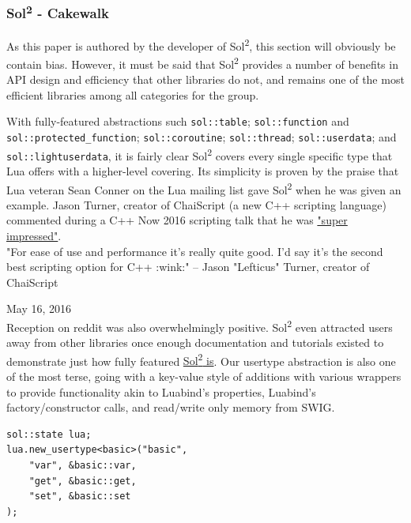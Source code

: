 \documentclass[conference,compsoc]{IEEEtran}
\newcommand{\soltwo}{Sol\textsuperscript{2}}
\begin{document}
\subsubsection{\soltwo{} - Cakewalk}

As this paper is authored by the developer of \soltwo{}, this section will obviously be contain bias. However, it must be said that \soltwo{} provides a number of benefits in API design and efficiency that other libraries do not, and remains one of the most efficient libraries among all categories for the group. 

With fully-featured abstractions such \lstinline|sol::table|; \lstinline|sol::function| and \lstinline|sol::protected_function|; \lstinline|sol::coroutine|; \lstinline|sol::thread|; \lstinline|sol::userdata|; and \lstinline|sol::lightuserdata|, it is fairly clear \soltwo{} covers every single specific type that Lua offers with a higher-level covering. Its simplicity is proven by the praise that Lua veteran Sean Conner on the Lua mailing list gave \soltwo{} when he was given an example\cite{conman-impressed}. Jason Turner, creator of ChaiScript\cite{chaiscript} (a new C++ scripting language) commented during a C++ Now 2016 scripting talk that he was \href{http://chat.stackoverflow.com/transcript/message/30509197\#30509197}{"super impressed"}.\\

\hfill "For ease of use and performance it's really quite good. I'd say it's the second best scripting option for C++ :wink:" -- Jason "Lefticus" Turner, creator of ChaiScript

\hfill May 16, 2016 \\

Reception on reddit was also overwhelmingly positive\cite{sol2-reddit}. \soltwo{} even attracted users away from other libraries once enough documentation and tutorials existed to demonstrate just how fully featured \href{https://github.com/ThePhD/sol2/issues/36\#issuecomment-199290974}{\soltwo{} is}. Our usertype abstraction is also one of the most terse, going with a key-value style of additions with various wrappers to provide functionality akin to Luabind's properties, Luabind's factory/constructor calls, and read/write only memory from SWIG.

\begin{lstlisting}[caption={\soltwo{} usertype example, performing the same binding for the \lstinline|basic| class as shown with many of the other libraries. Noticeably more terse.}, label={lst:sol-usertype}]
sol::state lua;
lua.new_usertype<basic>("basic",
	"var", &basic::var,
	"get", &basic::get,
	"set", &basic::set
);
\end{lstlisting}
\end{document}
